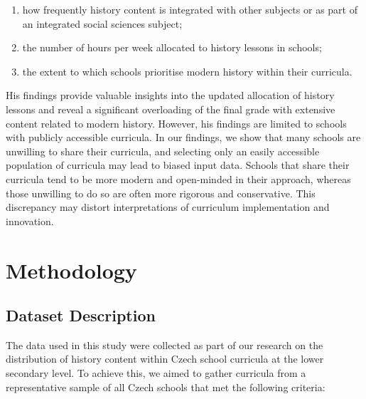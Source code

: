 \documentclass[]{interact}
\theoremstyle{plain}%
\theoremstyle{definition}
\theoremstyle{remark}
\begin{document}
\begin{enumerate}
	\item how frequently history content is integrated with other subjects or as part of an integrated social sciences subject;
	\item the number of hours per week allocated to history lessons in schools;
	\item the extent to which schools prioritise modern history within their curricula.
\end{enumerate}

His findings provide valuable insights into the updated allocation of history lessons and reveal a significant overloading of the final grade with extensive content related to modern history. However, his findings are limited to schools with publicly accessible curricula. In our findings, we show that many schools are unwilling to share their curricula, and selecting only an easily accessible population of curricula may lead to biased input data. Schools that share their curricula tend to be more modern and open-minded in their approach, whereas those unwilling to do so are often more rigorous and conservative. This discrepancy may distort interpretations of curriculum implementation and innovation.







\section{Methodology}

\subsection{Dataset Description}

The data used in this study were collected as part of our research on the distribution of history content within Czech school curricula at the lower secondary level. To achieve this, we aimed to gather curricula from a representative sample of all Czech schools that met the following criteria:
\end{document}
